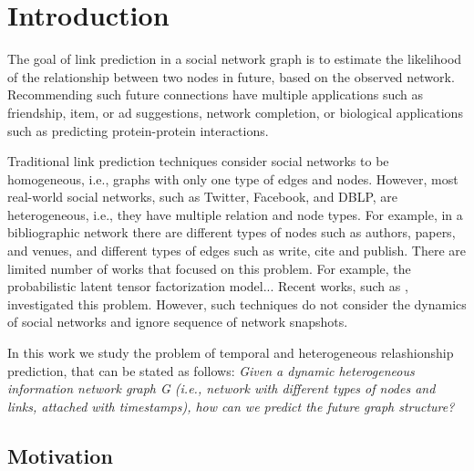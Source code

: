 \section{Introduction}
\label{Sec:Introduction}


The goal of link prediction in a social network graph \cite{liben2007link} is to estimate the likelihood of the relationship between two nodes in future, based on the observed network. Recommending such future connections have multiple applications such as friendship, item, or ad suggestions, network completion, or biological applications such as predicting protein-protein interactions.


Traditional link prediction techniques \cite{liben2007link} consider social networks to be homogeneous, i.e., graphs with only one type of edges and nodes. However, most real-world social networks, such as Twitter, Facebook, and DBLP, are heterogeneous, i.e., they have multiple relation and node types. For example, in a bibliographic network there are different types of nodes such as authors, papers, and venues, and different types of edges such as write, cite and publish. There are limited number of works that focused on this problem. For example, the probabilistic latent tensor factorization model... Recent works, such as \cite{sun2011pathsim}, investigated this problem. However, such techniques do not consider the dynamics of social networks and ignore sequence of network snapshots. 
\cite{Zhu2016} \cite{sun2011pathsim} \cite{Sun:2012:HRP:2124295.2124373}  \cite{huang2016meta} \cite{wang2016relsim} \cite{sun2013pathselclus} \cite{sun2011ASONAM} \cite{Yang2012} \cite{liben2007link}


In this work we study the problem of temporal and heterogeneous relashionship prediction, that can be stated as follows: \textit{Given a dynamic heterogeneous information network graph G (i.e., network with different types of nodes and links, attached with timestamps), how can we predict the future graph structure?}



\subsection{Motivation}

